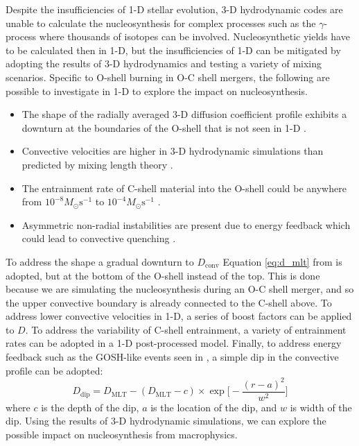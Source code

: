Despite the insufficiencies of 1-D stellar evolution, 3-D hydrodynamic codes are unable to calculate the nucleosynthesis for complex processes such as the $\gamma$-process where thousands of isotopes can be involved.
Nucleosynthetic yields have to be calculated then in 1-D, but the insufficiencies of 1-D can be mitigated by adopting the results of 3-D hydrodynamics and testing a variety of mixing scenarios.
Specific to O-shell burning in O-C shell mergers, the following are possible to investigate in 1-D to explore the impact on nucleosynthesis.

\begin{itemize}
\item The shape of the radially averaged 3-D diffusion coefficient profile exhibits a  downturn at the boundaries of the O-shell that is not seen in 1-D \citep{meakinTurbulentConvectionStellar2007, jonesIdealizedHydrodynamicSimulations2017}.
\item Convective velocities are higher in 3-D hydrodynamic simulations than predicted by mixing length theory \citep{jonesIdealizedHydrodynamicSimulations2017, rizzutiShellMergersLate2024a}.
\item The entrainment rate of C-shell material into the O-shell could be anywhere from $10^{-8}M_\odot \mathrm{s^{-1}}$ to $10^{-4}M_\odot \mathrm{s^{-1}}$ \citep{andrassy3DHydrodynamicSimulations2020}.
\item Asymmetric non-radial instabilities are present due to energy feedback which could lead to convective quenching \citep{andrassy3DHydrodynamicSimulations2020}. 
\end{itemize}

To address the shape a gradual downturn to $D_{\mathrm{conv}}$ Equation \ref{eq:d_mlt} from \cite{jonesIdealizedHydrodynamicSimulations2017} is adopted, but at the bottom of the O-shell instead of the top.
This is done because we are simulating the nucleosynthesis during an O-C shell merger, and so the upper convective boundary is already connected to the C-shell above.
To address lower convective velocities in 1-D, a series of boost factors can be applied to $D$.
To address the variability of C-shell entrainment, a variety of entrainment rates can be adopted in a 1-D post-processed model.
Finally, to address energy feedback such as the GOSH-like events seen in \cite{andrassy3DHydrodynamicSimulations2020}, a simple dip in the convective profile can be adopted:
\begin{equation}
D_{\mathrm{dip}}=D_{\mathrm{MLT}}-(D_{\mathrm{MLT}}-c)\times\exp\Biggl[-\frac{(r-a)^2}{w^2}\Biggr]
\end{equation}
where $c$ is the depth of the dip, $a$ is the location of the dip, and $w$ is width of the dip.
Using the results of 3-D hydrodynamic simulations, we can explore the possible impact on nucleosynthesis from macrophysics.